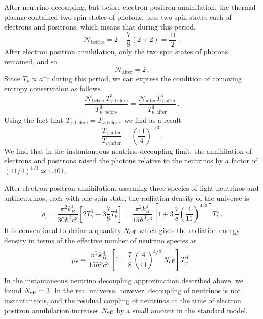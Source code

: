 After neutrino decoupling, but before electron positron annihilation, the thermal plasma contained two spin states of photons, plus two spin states each of electrons and positrons, which means that during this period,
\begin{equation}
	\mathcal{N}_{\mathrm{before}} = 2 + \frac{7}{8}(2+2) = \frac{11}{2} \, .
\end{equation}
After electron positron annihilation, only the two spin states of photons remained, and so
\begin{equation}
	\mathcal{N}_{\mathrm{after}} = 2 \, .
\end{equation}
Since $T_\nu\propto a^{-1}$ during this period, we can express the condition of comoving entropy conservation as follows
\begin{equation}
	\frac{\mathcal{N}_{\mathrm{before}}T_{\gamma,\mathrm{before}}^3}{T_{\nu,\mathrm{before}}^3} = \frac{\mathcal{N}_{\mathrm{after}}T_{\gamma,\mathrm{after}}^3}{T_{\nu,\mathrm{after}}^3} \, .
\end{equation}
Using the fact that $T_{\gamma,\mathrm{before}} = T_{\nu,\mathrm{before}}$, we find as a result
\begin{equation}
	\frac{T_{\gamma,\mathrm{after}}}{T_{\nu,\mathrm{after}}} = \left(\frac{11}{4}\right)^{1/3} \, .
\end{equation}
We find that in the instantaneous neutrino decoupling limit, the annihilation of electrons and positrons raised the photons relative to the neutrinos by a factor of $(11/4)^{1/3}\simeq1.401$.

After electron positron annihilation, assuming three species of light neutrinos and antineutrinos, each with one spin state, the radiation density of the universe is
\begin{equation}
	\rho_r = \frac{\pi^2k_B^4}{30\hbar^3 c^3}\left[2T_\gamma^4 + 3\frac{7}{8}T_\nu^4\right] = \frac{\pi^2k_B^4}{15\hbar^3 c^3}\left[1+3\,\frac{7}{8}\left(\frac{4}{11}\right)^{4/3}\right] T_\gamma^4 \, .
\end{equation}
It is conventional to define a quantity $N_{\rm eff}$ which gives the radiation energy density in terms of the effective number of neutrino species as
\begin{equation}
	\rho_r = \frac{\pi^2k_B^4}{15\hbar^3 c^3}\left[1+\frac{7}{8}\left(\frac{4}{11}\right)^{4/3}N_{\rm eff}\right] T_\gamma^4 \, .
\end{equation}
In the instantaneous neutrino decoupling approximation described above, we found $N_{\rm eff} = 3$.  In the real universe, however, decoupling of neutrinos is not instantaneous, and the residual coupling of neutrinos at the time of electron positron annihilation increases $N_{\rm eff}$ by a small amount in the standard model.

